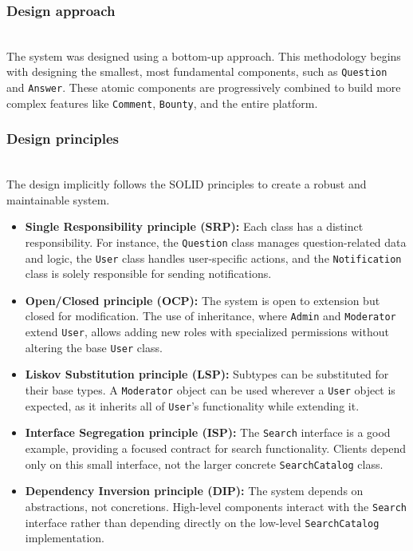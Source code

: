 \subsubsection{Design approach}\label{O4zZkMl1_2AaQc4ccZeKS}
\\
The system was designed using a bottom-up approach. This methodology begins with designing the smallest, most fundamental components, such as \texttt{Question} and \texttt{Answer}. These atomic components are progressively combined to build more complex features like \texttt{Comment}, \texttt{Bounty}, and the entire platform.

\subsubsection{Design principles}\label{QtHNktPLmao6L0uQ679-Z}
\\
The design implicitly follows the SOLID principles to create a robust and maintainable system.

\begin{itemize}
\item
\protect{}\label{ILIVZt9WZhzY9XNDNJhWv}
\textbf{Single Responsibility principle (SRP):} Each class has a distinct responsibility. For instance, the \texttt{Question} class manages question-related data and logic, the \texttt{User} class handles user-specific actions, and the \texttt{Notification} class is solely responsible for sending notifications.
\item
\protect{}\label{VqJiBBfY7fbOW3Op1VZNP}
\textbf{Open/Closed principle (OCP):} The system is open to extension but closed for modification. The use of inheritance, where \texttt{Admin} and \texttt{Moderator} extend \texttt{User}, allows adding new roles with specialized permissions without altering the base \texttt{User} class.
\item
\protect{}\label{PRrAL03lK7cEYuqiomJ_4}
\textbf{Liskov Substitution principle (LSP):} Subtypes can be substituted for their base types. A \texttt{Moderator} object can be used wherever a \texttt{User} object is expected, as it inherits all of \texttt{User}'s functionality while extending it.
\item
\protect{}\label{OOCrMYvdHx2JeFj_27TfU}
\textbf{Interface Segregation principle (ISP):} The \texttt{Search} interface is a good example, providing a focused contract for search functionality. Clients depend only on this small interface, not the larger concrete \texttt{SearchCatalog} class.
\item
\protect{}\label{SUhp-8iVUwSla6OXSk7NW}
\textbf{Dependency Inversion principle (DIP):} The system depends on abstractions, not concretions. High-level components interact with the \texttt{Search} interface rather than depending directly on the low-level \texttt{SearchCatalog} implementation.
\end{itemize}

